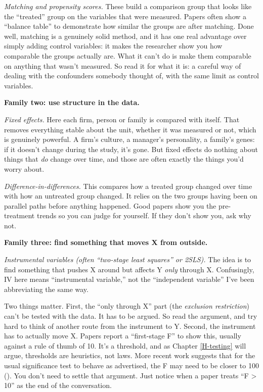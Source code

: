 \documentclass[
]{book}
\begin{document}
\emph{Matching and propensity scores.} These build a comparison group that looks like the ``treated'' group on the variables that were measured. Papers often show a ``balance table'' to demonstrate how similar the groups are after matching. Done well, matching is a genuinely solid method, and it has one real advantage over simply adding control variables: it makes the researcher show you how comparable the groups actually are. What it can't do is make them comparable on anything that wasn't measured. So read it for what it is: a careful way of dealing with the confounders somebody thought of, with the same limit as control variables.

\textbf{Family two: use structure in the data.}

\emph{Fixed effects.} Here each firm, person or family is compared with itself. That removes everything stable about the unit, whether it was measured or not, which is genuinely powerful. A firm's culture, a manager's personality, a family's genes: if it doesn't change during the study, it's gone. But fixed effects do nothing about things that \emph{do} change over time, and those are often exactly the things you'd worry about.

\emph{Difference-in-differences.} This compares how a treated group changed over time with how an untreated group changed. It relies on the two groups having been on parallel paths before anything happened. Good papers show you the pre-treatment trends so you can judge for yourself. If they don't show you, ask why not.

\textbf{Family three: find something that moves X from outside.}

\emph{Instrumental variables (often ``two-stage least squares'' or 2SLS).} The idea is to find something that pushes X around but affects Y \emph{only} through X. Confusingly, IV here means ``instrumental variable,'' not the ``independent variable'' I've been abbreviating the same way.

Two things matter. First, the ``only through X'' part (the \emph{exclusion restriction}) can't be tested with the data. It has to be argued. So read the argument, and try hard to think of another route from the instrument to Y. Second, the instrument has to actually move X. Papers report a ``first-stage F'' to show this, usually against a rule of thumb of 10. It's a threshold, and as Chapter \ref{H-testing} will argue, thresholds are heuristics, not laws. More recent work suggests that for the usual significance test to behave as advertised, the F may need to be closer to 100 (). You don't need to settle that argument. Just notice when a paper treats ``F \textgreater{} 10'' as the end of the conversation.
\end{document}

